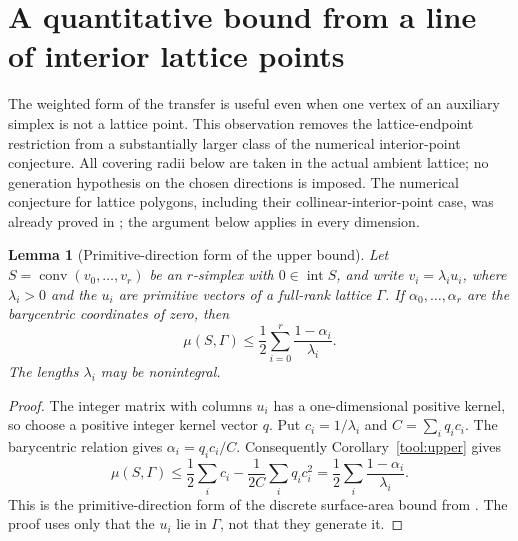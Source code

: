 \documentclass[11pt,a4paper]{article}
\newtheorem{lemma}[theorem]{Lemma}
\theoremstyle{remark}\newtheorem{remark}[theorem]{Remark}
\DeclareMathOperator{\conv}{conv}
\DeclareMathOperator{\inter}{int}
\begin{document}
\section{A quantitative bound from a line of interior lattice points}
\label{r3d:section}

The weighted form of the transfer is useful even when one vertex of an
auxiliary simplex is not a lattice point.  This observation removes the
lattice-endpoint restriction from a substantially larger class of the
numerical interior-point conjecture.  All covering radii below are taken
in the actual ambient lattice; no generation hypothesis on the chosen
directions is imposed.  The numerical conjecture for lattice polygons,
including their collinear-interior-point case, was already proved in
\cite[Theorem 6.3]{CSS}; the argument below applies in every dimension.

\begin{lemma}[Primitive-direction form of the upper bound]
\label{r3d:primitive}
Let $S=\conv(v_0,\ldots,v_r)$ be an $r$-simplex with $0\in\inter S$,
and write $v_i=\lambda_i u_i$, where $\lambda_i>0$ and the $u_i$ are
primitive vectors of a full-rank lattice $\Gamma$.  If
$\alpha_0,\ldots,\alpha_r$ are the barycentric coordinates of zero,
then
\begin{equation}\label{r3d:primitiveeq}
 \mu(S,\Gamma)\le
 \frac12\sum_{i=0}^{r}\frac{1-\alpha_i}{\lambda_i}.
\end{equation}
The lengths $\lambda_i$ may be nonintegral.
\end{lemma}
\begin{proof}
The integer matrix with columns $u_i$ has a one-dimensional positive
kernel, so choose a positive integer kernel vector $q$.  Put
$c_i=1/\lambda_i$ and $C=\sum_iq_ic_i$.  The barycentric relation gives
$\alpha_i=q_ic_i/C$.  Consequently Corollary~\ref{tool:upper} gives
\[
 \mu(S,\Gamma)
 \le\frac12\sum_i c_i-\frac{1}{2C}\sum_iq_ic_i^2
 =\frac12\sum_i\frac{1-\alpha_i}{\lambda_i}.
\]
This is the primitive-direction form of the discrete surface-area
bound from \cite{VMRC200}.  The proof uses only that the $u_i$ lie in
$\Gamma$, not that they generate it.
\end{proof}
\end{document}
